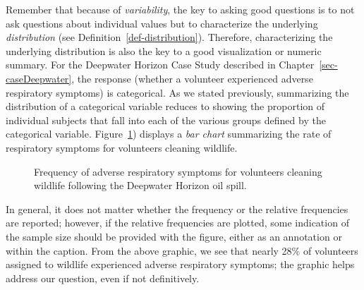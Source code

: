 \documentclass[
  letterpaper,
  DIV=11,
  numbers=noendperiod]{scrreprt}
\theoremstyle{definition}
\theoremstyle{definition}
\theoremstyle{plain}
\theoremstyle{remark}
\begin{document}
Remember that because of \emph{variability}, the key to asking good
questions is to not ask questions about individual values but to
characterize the underlying \emph{distribution} (see
Definition~\ref{def-distribution}). Therefore, characterizing the
underlying distribution is also the key to a good visualization or
numeric summary. For the Deepwater Horizon Case Study described in
Chapter~\ref{sec-caseDeepwater}, the response (whether a volunteer
experienced adverse respiratory symptoms) is categorical. As we stated
previously, summarizing the distribution of a categorical variable
reduces to showing the proportion of individual subjects that fall into
each of the various groups defined by the categorical variable.
Figure~\ref{fig-summaries-deepwater-barchart}) displays a \emph{bar
chart} summarizing the rate of respiratory symptoms for volunteers
cleaning wildlife.

\begin{figure}


\caption{\label{fig-summaries-deepwater-barchart}Frequency of adverse
respiratory symptoms for volunteers cleaning wildlife following the
Deepwater Horizon oil spill.}

\end{figure}%

In general, it does not matter whether the frequency or the relative
frequencies are reported; however, if the relative frequencies are
plotted, some indication of the sample size should be provided with the
figure, either as an annotation or within the caption. From the above
graphic, we see that nearly 28\% of volunteers assigned to wildlife
experienced adverse respiratory symptoms; the graphic helps address our
question, even if not definitively.
\end{document}
